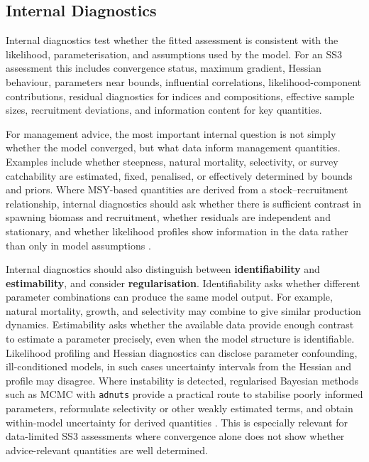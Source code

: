 \documentclass[11pt,a4paper]{article}
\begin{document}
\subsection{Internal Diagnostics}
Internal diagnostics test whether the fitted assessment is consistent with the likelihood, parameterisation, and assumptions used by the model. For an SS3 assessment this includes convergence status, maximum gradient, Hessian behaviour, parameters near bounds, influential correlations, likelihood-component contributions, residual diagnostics for indices and compositions, effective sample sizes, recruitment deviations, and information content for key quantities.

For management advice, the most important internal question is not simply whether the model converged, but what data inform management quantities. Examples include whether steepness, natural mortality, selectivity, or survey catchability are estimated, fixed, penalised, or effectively determined by bounds and priors. Where MSY-based quantities are derived from a stock--recruitment relationship, internal diagnostics should ask whether there is sufficient contrast in spawning biomass and recruitment, whether residuals are independent and stationary, and whether likelihood profiles show information in the data rather than only in model assumptions \citep[][]{kell2025profile}.

Internal diagnostics should also distinguish between \textbf{identifiability} and \textbf{estimability}, and consider \textbf{regularisation}. Identifiability asks whether different parameter combinations can produce the same model output. For example, natural mortality, growth, and selectivity may combine to give similar production dynamics. Estimability asks whether the available data provide enough contrast to estimate a parameter precisely, even when the model structure is identifiable. Likelihood profiling and Hessian diagnostics can disclose parameter confounding, ill-conditioned models, in such cases uncertainty intervals from the Hessian and profile may disagree. Where instability is detected, regularised Bayesian methods such as MCMC with \texttt{adnuts} provide a practical route to stabilise poorly informed parameters, reformulate selectivity or other weakly estimated terms, and obtain within-model uncertainty for derived quantities \citep{courtney2024adnuts}. This is especially relevant for data-limited SS3 assessments where convergence alone does not show whether advice-relevant quantities are well determined.
\end{document}
